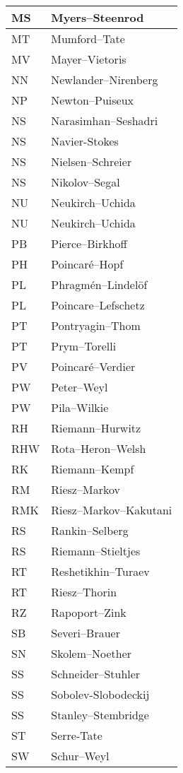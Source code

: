 \documentclass{amsart}
\numberwithin{equation}{section}
\theoremstyle{plain}
\numberwithin{equation}{section}
\theoremstyle{remark}
\begin{document}
\begin{multicols}{2}
{\begin{longtable}{l|l}
MS & Myers--Steenrod\\ \hline
MT & Mumford--Tate\\ \hline
MV & Mayer--Vietoris\\ \hline
NN & Newlander--Nirenberg\\ \hline
NP & Newton--Puiseux\\ \hline
NS & Narasimhan--Seshadri\\ \hline
NS & Navier-Stokes\\ \hline
NS & Nielsen--Schreier\\ \hline
NS & Nikolov--Segal\\ \hline
NU & Neukirch--Uchida\\ \hline
NU & Neukirch--Uchida\\ \hline
PB & Pierce--Birkhoff\\ \hline
PH & Poincaré--Hopf\\ \hline
PL & Phragmén--Lindelöf\\ \hline
PL & Poincare--Lefschetz\\ \hline
PT & Pontryagin--Thom\\ \hline
PT & Prym--Torelli\\ \hline
PV & Poincaré--Verdier\\ \hline
PW & Peter--Weyl\\ \hline
PW & Pila--Wilkie\\ \hline
RH & Riemann--Hurwitz\\ \hline
RHW & Rota--Heron--Welsh\\ \hline
RK & Riemann--Kempf\\ \hline
RM & Riesz--Markov\\ \hline
RMK & Riesz--Markov--Kakutani\\ \hline
RS & Rankin--Selberg\\ \hline
RS & Riemann--Stieltjes\\ \hline
RT & Reshetikhin--Turaev\\ \hline
RT & Riesz--Thorin\\ \hline
RZ & Rapoport--Zink\\ \hline
SB & Severi--Brauer\\ \hline
SN & Skolem--Noether\\ \hline
SS & Schneider--Stuhler\\ \hline
SS & Sobolev-Slobodeckij\\ \hline
SS & Stanley--Stembridge\\ \hline
ST & Serre-Tate\\ \hline
SW & Schur--Weyl\\ \hline

\end{longtable}}
\end{multicols}
\end{document}
